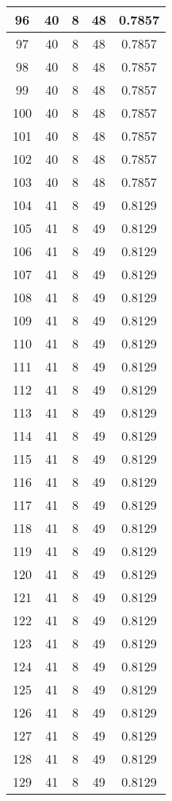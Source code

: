 \documentclass[letterpaper, 12pt]{article}
\begin{document}
\begin{longtable}{|c|c|c|c|c|}
\hline
96 & 40 & 8 & 48 & 0.7857 \\
\hline
97 & 40 & 8 & 48 & 0.7857 \\
\hline
98 & 40 & 8 & 48 & 0.7857 \\
\hline
99 & 40 & 8 & 48 & 0.7857 \\
\hline
100 & 40 & 8 & 48 & 0.7857 \\
\hline
101 & 40 & 8 & 48 & 0.7857 \\
\hline
102 & 40 & 8 & 48 & 0.7857 \\
\hline
103 & 40 & 8 & 48 & 0.7857 \\
\hline
104 & 41 & 8 & 49 & 0.8129 \\
\hline
105 & 41 & 8 & 49 & 0.8129 \\
\hline
106 & 41 & 8 & 49 & 0.8129 \\
\hline
107 & 41 & 8 & 49 & 0.8129 \\
\hline
108 & 41 & 8 & 49 & 0.8129 \\
\hline
109 & 41 & 8 & 49 & 0.8129 \\
\hline
110 & 41 & 8 & 49 & 0.8129 \\
\hline
111 & 41 & 8 & 49 & 0.8129 \\
\hline
112 & 41 & 8 & 49 & 0.8129 \\
\hline
113 & 41 & 8 & 49 & 0.8129 \\
\hline
114 & 41 & 8 & 49 & 0.8129 \\
\hline
115 & 41 & 8 & 49 & 0.8129 \\
\hline
116 & 41 & 8 & 49 & 0.8129 \\
\hline
117 & 41 & 8 & 49 & 0.8129 \\
\hline
118 & 41 & 8 & 49 & 0.8129 \\
\hline
119 & 41 & 8 & 49 & 0.8129 \\
\hline
120 & 41 & 8 & 49 & 0.8129 \\
\hline
121 & 41 & 8 & 49 & 0.8129 \\
\hline
122 & 41 & 8 & 49 & 0.8129 \\
\hline
123 & 41 & 8 & 49 & 0.8129 \\
\hline
124 & 41 & 8 & 49 & 0.8129 \\
\hline
125 & 41 & 8 & 49 & 0.8129 \\
\hline
126 & 41 & 8 & 49 & 0.8129 \\
\hline
127 & 41 & 8 & 49 & 0.8129 \\
\hline
128 & 41 & 8 & 49 & 0.8129 \\
\hline
129 & 41 & 8 & 49 & 0.8129 \\

\end{longtable}
\end{document}
